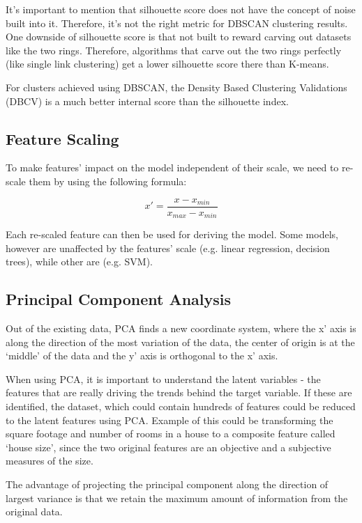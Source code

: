 \documentclass{article}
\begin{document}
It’s important to mention that silhouette score does not have the concept of noise built into it. Therefore, it’s not the right metric for DBSCAN clustering results. One downside of silhouette score is that not built to reward carving out datasets like the two rings. Therefore, algorithms that carve out the two rings perfectly (like single link clustering) get a lower silhouette score there than K-means.

For clusters achieved using DBSCAN, the Density Based Clustering Validations (DBCV) is a much better internal score than the silhouette index.

\subsection{Feature Scaling}
To make features’ impact on the model independent of their scale, we need to re-scale them by using the following formula:

\begin{equation}
  x' = \frac{x - x_{min}}{x_{max} - x_{min}}
\end{equation}

Each re-scaled feature can then be used for deriving the model. Some models, however are unaffected by the features’ scale (e.g. linear regression, decision trees), while other are (e.g. SVM).

\subsection{Principal Component Analysis}
Out of the existing data, PCA finds a new coordinate system, where the x’ axis is along the direction of the most variation of the data, the center of origin is at the ‘middle’ of the data and the y’ axis is orthogonal to the x’ axis.

When using PCA, it is important to understand the latent variables - the features that are really driving the trends behind the target variable. If these are identified, the dataset, which could contain hundreds of features could be reduced to the latent features using PCA. Example of this could be transforming the square footage and number of rooms in a house to a composite feature called ‘house size’, since the two original features are an objective and a subjective measures of the size.

The advantage of projecting the principal component along the direction of largest variance is that we retain the maximum amount of information from the original data.
\end{document}
